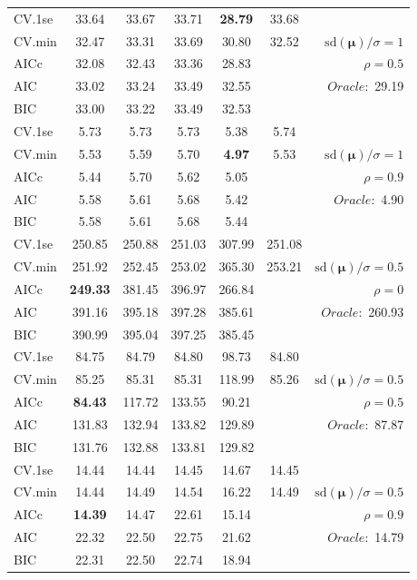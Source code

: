 \begin{table}
\begin{center}
\begin{tabular}{l*{5}{c}|r}
 \hline 
CV.1se & 33.64 & 33.67 & 33.71 & {\bf 28.79} & 33.68 & \\
CV.min & 32.47 & 33.31 & 33.69 & 30.80 & 32.52 &  $\mathrm{sd}(\mathbf{\mu})/\sigma=1$ \\
AICc & 32.08 & 32.43 & 33.36 & 28.83 & & $\rho=0.5$ \\
AIC & 33.02 & 33.24 & 33.49 & 32.55 & &  \multirow{2}{*}{$Oracle: $ 29.19} \\
BIC & 33.00 & 33.22 & 33.49 & 32.53 & &  \\
 \hline 
CV.1se & 5.73 & 5.73 & 5.73 & 5.38 & 5.74 & \\
CV.min & 5.53 & 5.59 & 5.70 & {\bf 4.97} & 5.53 &  $\mathrm{sd}(\mathbf{\mu})/\sigma=1$ \\
AICc & 5.44 & 5.70 & 5.62 & 5.05 & & $\rho=0.9$ \\
AIC & 5.58 & 5.61 & 5.68 & 5.42 & &  \multirow{2}{*}{$Oracle: $ 4.90} \\
BIC & 5.58 & 5.61 & 5.68 & 5.44 & &  \\
 \hline 
CV.1se & 250.85 & 250.88 & 251.03 & 307.99 & 251.08 & \\
CV.min & 251.92 & 252.45 & 253.02 & 365.30 & 253.21 &  $\mathrm{sd}(\mathbf{\mu})/\sigma=0.5$ \\
AICc & {\bf 249.33} & 381.45 & 396.97 & 266.84 & & $\rho=0$ \\
AIC & 391.16 & 395.18 & 397.28 & 385.61 & &  \multirow{2}{*}{$Oracle: $ 260.93} \\
BIC & 390.99 & 395.04 & 397.25 & 385.45 & &  \\
 \hline 
CV.1se & 84.75 & 84.79 & 84.80 & 98.73 & 84.80 & \\
CV.min & 85.25 & 85.31 & 85.31 & 118.99 & 85.26 &  $\mathrm{sd}(\mathbf{\mu})/\sigma=0.5$ \\
AICc & {\bf 84.43} & 117.72 & 133.55 & 90.21 & & $\rho=0.5$ \\
AIC & 131.83 & 132.94 & 133.82 & 129.89 & &  \multirow{2}{*}{$Oracle: $ 87.87} \\
BIC & 131.76 & 132.88 & 133.81 & 129.82 & &  \\
 \hline 
CV.1se & 14.44 & 14.44 & 14.45 & 14.67 & 14.45 & \\
CV.min & 14.44 & 14.49 & 14.54 & 16.22 & 14.49 &  $\mathrm{sd}(\mathbf{\mu})/\sigma=0.5$ \\
AICc & {\bf 14.39} & 14.47 & 22.61 & 15.14 & & $\rho=0.9$ \\
AIC & 22.32 & 22.50 & 22.75 & 21.62 & &  \multirow{2}{*}{$Oracle: $ 14.79} \\
BIC & 22.31 & 22.50 & 22.74 & 18.94 & &  \\
 \hline 
\end{tabular}
\end{center}
\vspace{-1cm}
\end{table}




